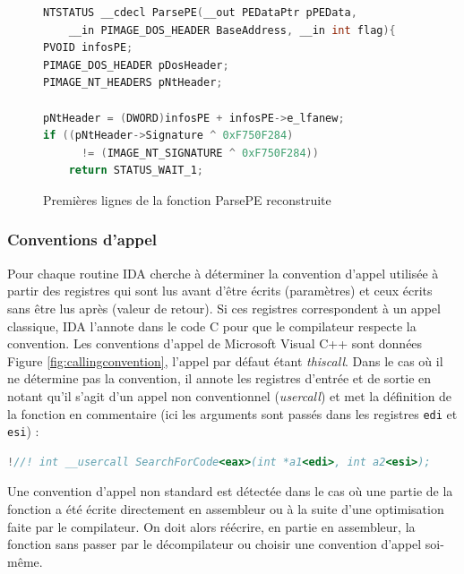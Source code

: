 \begin{figure}[h]
\begin{center}
\begin{lstlisting}[language={C}]
NTSTATUS __cdecl ParsePE(__out PEDataPtr pPEData, 
    __in PIMAGE_DOS_HEADER BaseAddress, __in int flag){
PVOID infosPE;
PIMAGE_DOS_HEADER pDosHeader;
PIMAGE_NT_HEADERS pNtHeader;

pNtHeader = (DWORD)infosPE + infosPE->e_lfanew;
if ((pNtHeader->Signature ^ 0xF750F284) 
      != (IMAGE_NT_SIGNATURE ^ 0xF750F284)) 
    return STATUS_WAIT_1; 
\end{lstlisting}
\end{center}
\caption{Premières lignes de la fonction ParsePE reconstruite\label{fig:ParsePEFinal}}
\end{figure}

\subsubsection{Conventions d'appel}

Pour chaque routine IDA cherche à déterminer la convention d'appel utilisée à partir des registres qui sont lus avant d'être écrits (paramètres) et ceux écrits sans être lus après (valeur de retour). Si ces registres correspondent à un appel classique, IDA l'annote dans le code C pour que le compilateur respecte la convention. Les conventions d'appel de Microsoft Visual C++ sont données Figure \ref{fig:callingconvention}, l'appel par défaut étant \emph{thiscall}. Dans le cas où il ne détermine pas la convention, il annote les registres d'entrée et de sortie en notant qu'il s'agit d'un appel non conventionnel (\emph{usercall}) et met la définition de la fonction en commentaire (ici les arguments sont passés dans les registres \texttt{edi} et \texttt{esi}) :
\begin{small}
\begin{lstlisting}[language={C}, escapechar=!]
!//! int __usercall SearchForCode<eax>(int *a1<edi>, int a2<esi>);
\end{lstlisting}
\end{small}

Une convention d'appel non standard est détectée dans le cas où une partie de la fonction a été écrite directement en assembleur ou à la suite d'une optimisation faite par le compilateur. On doit alors réécrire, en partie en assembleur, la fonction sans passer par le décompilateur ou choisir une convention d'appel soi-même.

